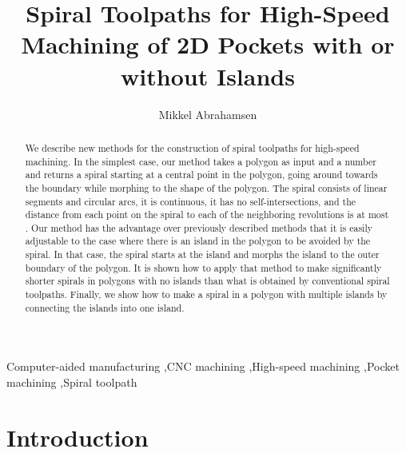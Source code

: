 \documentclass[3p]{elsarticle}
\begin{document}
\begin{frontmatter}

\title{Spiral Toolpaths for High-Speed Machining of 2D Pockets with or without Islands}
\author{Mikkel Abrahamsen}
\address{Department of Computer Science\\
University of Copenhagen\\
Universitetsparken 5\\
DK-2100 K\o{}benhavn \O\\
Denmark\\
\texttt{miab@di.ku.dk}}

\begin{abstract}
We describe new methods for the construction of spiral toolpaths for high-speed machining.
In the simplest case, our method takes a polygon as input and a number  and
returns a spiral starting at a central point in the polygon, going around towards the boundary
while morphing to the shape of the polygon. The spiral consists of
linear segments and circular arcs, it is  continuous, it has no self-intersections, and
the distance from each point on the spiral to each of the neighboring revolutions is at most .
Our method has the advantage over previously described methods that it is
easily adjustable to the case where there is an island in the polygon to be avoided by the spiral.
In that case, the spiral starts at the island and morphs
the island to the outer boundary of the polygon. It is shown how to apply that method to make
significantly shorter spirals in polygons with no islands than what is obtained by conventional
spiral toolpaths. Finally, we show how to make
a spiral in a polygon with multiple islands by connecting the islands into one island.
\end{abstract}

\begin{keyword}
Computer-aided manufacturing \sep CNC machining \sep High-speed machining
\sep Pocket machining \sep Spiral toolpath




\end{keyword}

\end{frontmatter}





\section{Introduction}
\end{document}
